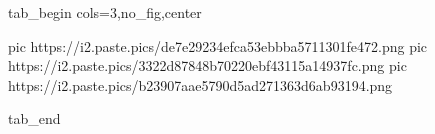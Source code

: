  
 
 
 
 


\ifcmt
  tab_begin cols=3,no_fig,center

     pic https://i2.paste.pics/de7e29234efca53ebbba5711301fe472.png
		 pic https://i2.paste.pics/3322d87848b70220ebf43115a14937fc.png
		 pic https://i2.paste.pics/b23907aae5790d5ad271363d6ab93194.png

  tab_end
\fi
